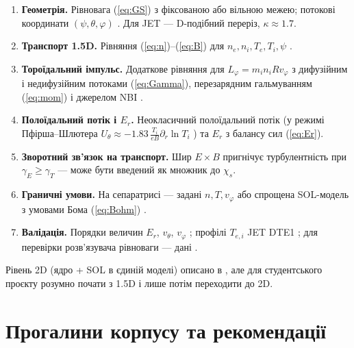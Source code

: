 \documentclass[11pt,a4paper]{article}
\begin{document}
\begin{enumerate}
  \item \textbf{Геометрія.} Рівновага (\ref{eq:GS}) з фіксованою або вільною межею;
        потокові координати $(\psi,\theta,\varphi)$
        \cite{Merlo2011,Seto2014}. Для JET --- D-подібний переріз, $\kappa\approx1.7$.
  \item \textbf{Транспорт 1.5D.} Рівняння (\ref{eq:n})--(\ref{eq:B}) для
        $n_e,n_i,T_e,T_i,\psi$ \cite{Fukuyama1992,Tyshchenko2021}.
  \item \textbf{Тороїдальний імпульс.} Додаткове рівняння для $L_\varphi=m_in_iRv_\varphi$
        з дифузійним і недифузійним потоками (\ref{eq:Gamma}), перезарядним
        гальмуванням (\ref{eq:mom}) і джерелом NBI \cite{Singh2004,Ida2001,Sigmar1987}.
  \item \textbf{Полоїдальний потік і $E_r$.} Неокласичний полоїдальний потік
        (у режимі Пфірша--Шлютера $U_\theta\approx-1.83\,\frac{T_i}{eB}\partial_r\ln T_i$
        \cite{Singh2004}) та $E_r$ з балансу сил (\ref{eq:Er}).
  \item \textbf{Зворотний зв'язок на транспорт.} Шир $E\times B$ пригнічує
        турбулентність при $\gamma_E\ge\gamma_T$ \cite{Singh2004,Wang2006} ---
        може бути введений як множник до $\chi_s$.
  \item \textbf{Граничні умови.} На сепаратрисі --- задані $n,T,v_\varphi$ або
        спрощена SOL-модель з умовами Бома (\ref{eq:Bohm}) \cite{AhoMantila2011}.
  \item \textbf{Валідація.} Порядки величин $E_r$, $v_\theta$, $v_\varphi$
        \cite{Ida2001}; профілі $T_{e,i}$ JET DTE1 \cite{Tyshchenko2021}; для
        перевірки розв'язувача рівноваги --- дані \cite{Merlo2011}.
\end{enumerate}

\noindent Рівень 2D (ядро + SOL в єдиній моделі) описано в \cite{Seto2014}, але для
студентського проєкту розумно почати з 1.5D і лише потім переходити до 2D.

\section{Прогалини корпусу та рекомендації}
\end{document}

